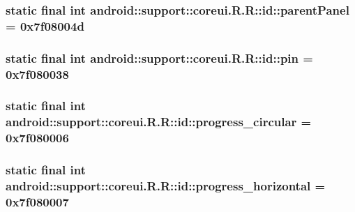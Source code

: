 \hypertarget{classandroid_1_1support_1_1coreui_1_1_r_1_1id_84c4e2ae7e929980acf0e538db25cd11}{
\subsubsection[{parentPanel}]{\setlength{\rightskip}{0pt plus 5cm}static final int android::support::coreui.R.R::id::parentPanel = 0x7f08004d}}
\label{classandroid_1_1support_1_1coreui_1_1_r_1_1id_84c4e2ae7e929980acf0e538db25cd11}


\hypertarget{classandroid_1_1support_1_1coreui_1_1_r_1_1id_6283a2295e42f81024acc9211980e3a7}{
\subsubsection[{pin}]{\setlength{\rightskip}{0pt plus 5cm}static final int android::support::coreui.R.R::id::pin = 0x7f080038}}
\label{classandroid_1_1support_1_1coreui_1_1_r_1_1id_6283a2295e42f81024acc9211980e3a7}


\hypertarget{classandroid_1_1support_1_1coreui_1_1_r_1_1id_b2e252ca7257db3de94673c7379af58b}{
\subsubsection[{progress\_\-circular}]{\setlength{\rightskip}{0pt plus 5cm}static final int android::support::coreui.R.R::id::progress\_\-circular = 0x7f080006}}
\label{classandroid_1_1support_1_1coreui_1_1_r_1_1id_b2e252ca7257db3de94673c7379af58b}


\hypertarget{classandroid_1_1support_1_1coreui_1_1_r_1_1id_08036d5ce8a1ea3e5c26d9936b847b1a}{
\subsubsection[{progress\_\-horizontal}]{\setlength{\rightskip}{0pt plus 5cm}static final int android::support::coreui.R.R::id::progress\_\-horizontal = 0x7f080007}}
\label{classandroid_1_1support_1_1coreui_1_1_r_1_1id_08036d5ce8a1ea3e5c26d9936b847b1a}


